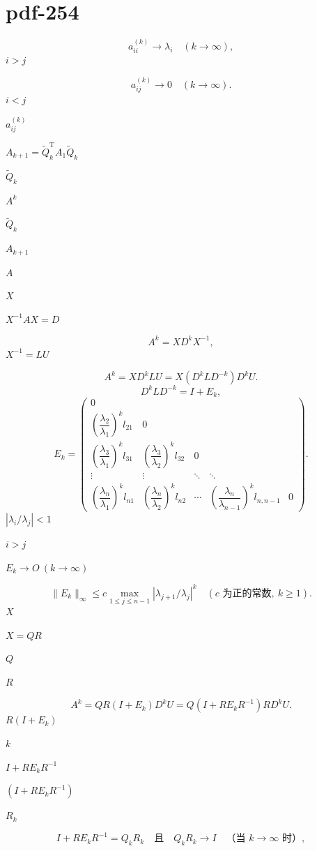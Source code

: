 \documentclass[UTF8,fontset=fandol]{ctexart}
\begin{document}
\section*{pdf-254}
\[
a_{ii}^{(k)}\to\lambda_i\quad(k\to\infty),
\tag{9.4.11}
\]
$i>j$\par
\[
a_{ij}^{(k)}\to0\quad(k\to\infty).
\tag{9.4.12}
\]
$i<j$\par
$a_{ij}^{(k)}$\par
$A_{k+1}=\widetilde Q_k^{\mathrm T}A_1\widetilde Q_k$\par
$\widetilde Q_k$\par
$A^k$\par
$\widetilde Q_k$\par
$A_{k+1}$\par
$A$\par
$X$\par
$X^{-1}AX=D$\par
\[
A^k=XD^kX^{-1},
\tag{9.4.13}
\]
$X^{-1}=LU$\par
\[
A^k=XD^kLU=X(D^kLD^{-k})D^kU.
\]
\[
D^kLD^{-k}=I+E_k,
\]
\[
E_k=\begin{pmatrix}
0&&&&\\
\left(\dfrac{\lambda_2}{\lambda_1}\right)^k l_{21}&0&&&\\
\left(\dfrac{\lambda_3}{\lambda_1}\right)^k l_{31}&\left(\dfrac{\lambda_3}{\lambda_2}\right)^k l_{32}&0&&\\
\vdots&\vdots&\ddots&\ddots&\\
\left(\dfrac{\lambda_n}{\lambda_1}\right)^k l_{n1}&\left(\dfrac{\lambda_n}{\lambda_2}\right)^k l_{n2}&\cdots&\left(\dfrac{\lambda_n}{\lambda_{n-1}}\right)^k l_{n,n-1}&0
\end{pmatrix}.
\]
$|\lambda_i/\lambda_j|<1$\par
$i>j$\par
$E_k\to O\ (k\to\infty)$\par
\[
\|E_k\|_\infty\leq c\max_{1\leq j\leq n-1}|\lambda_{j+1}/\lambda_j|^k
\quad(c\text{ 为正的常数},\ k\geq1).
\tag{9.4.14}
\]
$X$\par
$X=QR$\par
$Q$\par
$R$\par
\[
A^k=QR(I+E_k)D^kU=Q(I+RE_kR^{-1})RD^kU.
\tag{9.4.15}
\]
$R(I+E_k)$\par
$k$\par
$I+RE_kR^{-1}$\par
$(I+RE_kR^{-1})$\par
$R_k$\par
\[
I+RE_kR^{-1}=Q_kR_k\quad\text{且}\quad Q_kR_k\to I\quad\text{（当 }k\to\infty\text{ 时）},
\]
\end{document}
